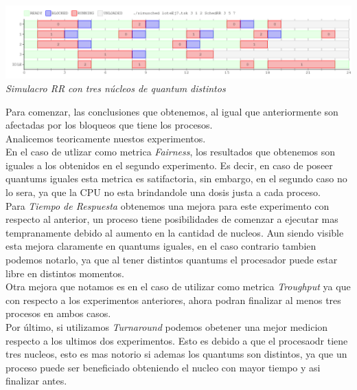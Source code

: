 \vspace{\baselineskip}
\begin{center}
\includegraphics[scale=0.45]{../tp1/Test/resEj7Co3dis.png}
\\
\vspace{1pt}
\footnotesize\textit{Simulacro RR con tres n\'ucleos de quantum distintos}
\end{center}
\vspace{\baselineskip}

Para comenzar, las conclusiones que obtenemos, al igual que anteriormente son afectadas por los bloqueos que tiene los procesos.\\
Analicemos teoricamente nuestos experimentos.\\
En el caso de utlizar como metrica \textit{Fairness}, los resultados que obtenemos son iguales a los obtenidos en el segundo experimento. Es decir, en caso de poseer quantums iguales esta metrica es satifactoria, sin embargo, en el segundo caso no lo sera, ya que la CPU no esta brindandole una dosis justa a cada proceso.\\
Para \textit{Tiempo de Respuesta} obtenemos una mejora para este experimento con respecto al anterior, un proceso tiene posibilidades de comenzar a ejecutar mas tempranamente debido al aumento en la cantidad de nucleos. Aun siendo visible esta mejora claramente en quantums iguales, en el caso contrario tambien podemos notarlo, ya que al tener distintos quantums el procesador puede estar libre en distintos momentos.\\
Otra mejora que notamos es en el caso de utilizar como metrica \textit{Troughput} ya que con respecto a los experimentos anteriores, ahora podran finalizar al menos tres procesos en ambos casos.\\
Por último, si utilizamos \textit{Turnaround} podemos obetener una mejor medicion respecto a los ultimos dos experimentos. Esto es debido a que el procesaodr tiene tres nucleos, esto es mas notorio si ademas los quantums son distintos, ya que un proceso puede ser beneficiado obteniendo el nucleo con mayor tiempo y asi finalizar antes.

